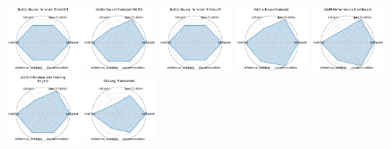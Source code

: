 \begin{figure}[ht!]
\centering
\includegraphics[width=0.1900\textwidth]{images/nixtla_neural_forecast_timegpt_radar.pdf}
\includegraphics[width=0.1900\textwidth]{images/nixtla_neural_forecast_nhits_radar.pdf}
\includegraphics[width=0.1900\textwidth]{images/nixtla_neural_forecast_timellm_radar.pdf}
\includegraphics[width=0.1900\textwidth]{images/nixtla_neuralforecast_radar.pdf}
\includegraphics[width=0.1900\textwidth]{images/vllm_performance_dashboard_radar.pdf}
\\[1ex]
\includegraphics[width=0.1900\textwidth]{images/vllm_inference_and_serving_engine_radar.pdf}
\includegraphics[width=0.1900\textwidth]{images/sglang_framework_radar.pdf}

\end{figure}
